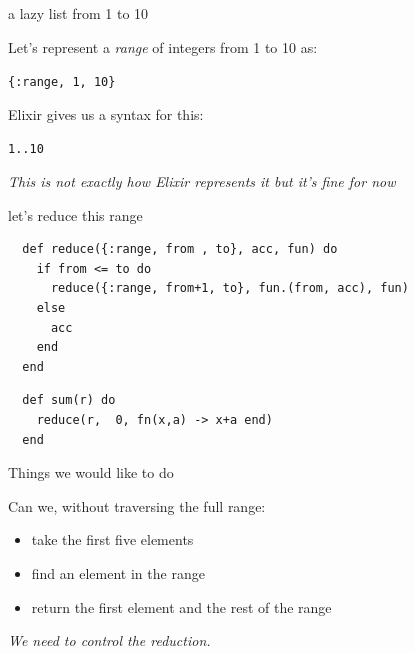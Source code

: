 \begin{frame}{a lazy list from 1 to 10}

  Let's represent a {\em range} of integers from 1 to 10 as:

  \vspace{10pt}\hspace{20pt} {\tt \{:range, 1, 10\}}

  \vspace{10pt}\pause

  Elixir gives us a syntax for this:

    \vspace{10pt}\hspace{20pt} {\tt 1..10}
  

    
  \vspace{40pt}\pause
  {\em This is not exactly how Elixir represents it but it's fine for now}

\end{frame}


\begin{frame}[fragile]{let's reduce this range}

  \begin{verbatim}
  def reduce({:range, from , to}, acc, fun) do
    if from <= to do
      reduce({:range, from+1, to}, fun.(from, acc), fun)
    else
      acc
    end
  end
\end{verbatim}

\vspace{20pt}  \pause
  
\begin{verbatim}
  def sum(r) do
    reduce(r,  0, fn(x,a) -> x+a end)
  end
\end{verbatim}
  
\vspace{10pt}
  
\end{frame}

\begin{frame}{Things we would like to do}

  Can we, without traversing the full range:
  \begin{itemize}
  \item take the first five elements
  \item find an element in the range
  \item return the first element and the rest of the range
  \end{itemize}

  \vspace{20pt}\pause
  {\em We need to control the reduction.}
\end{frame}



